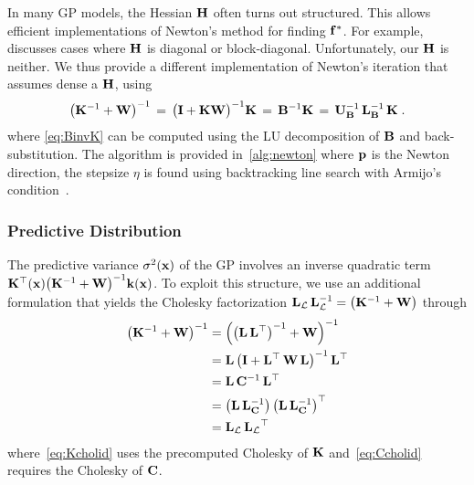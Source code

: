 In many GP models, the Hessian \(\mathbf{H}\) often turns out structured.
This allows efficient implementations of Newton's method for finding \(\mathbf{f}^*\).
For example,~\cite{rasmussen_gaussian_2006} discusses cases where \(\mathbf{H}\) is diagonal or block-diagonal.
Unfortunately, our \(\mathbf{H}\) is neither.
We thus provide a different implementation of Newton's iteration that assumes dense a \(\mathbf{H}\), using 
{\small
\begin{align}
  {\big(\mathbf{K}^{-1} + \mathbf{W}\big)}^{-1}
  \,=\, {{\big(\mathbf{I} + \mathbf{K} \mathbf{W} \big)}^{-1} \mathbf{K}} 
  \,=\, \mathbf{B}^{-1} \mathbf{K} 
  \,=\, \mathbf{U}_{\mathbf{B}}^{-1} \, \mathbf{L}_{\mathbf{B}}^{-1} \, \mathbf{K} \label{eq:BinvK}
\;.
\end{align}
}
where \cref{eq:BinvK} can be computed using the LU decomposition of \(\mathbf{B}\) and back-substitution.
The algorithm is provided in~\cref{alg:newton} where \(\mathbf{p}\) is the Newton direction, the stepsize \(\eta\) is found using backtracking line search with Armijo's condition~\cite{nocedal_numerical_2006}.

\subsubsection{Predictive Distribution}
The predictive variance \(\sigma^2(\mathbf{x})\) of the GP involves an inverse quadratic term \(\mathbf{K}^{\top}(\mathbf{x}) {\big(\mathbf{K}^{-1} + \mathbf{W}\big)}^{-1} \mathbf{k}(\mathbf{x})\).
To exploit this structure, we use an additional formulation that yields the Cholesky factorization \(\mathbf{L}_{\mathcal{L}} \, \mathbf{L}^{-1}_{\mathcal{L}}  = {\big(\mathbf{K}^{-1} + \mathbf{W}\big)}\) through 
\begin{align}
  {\big(\mathbf{K}^{-1} + \mathbf{W}\big)}^{-1}
  &= { \Big({\big(\mathbf{L}\,\mathbf{L}^{\top}\big)}^{-1} + \mathbf{W} \Big) }^{-1} \label{eq:Kcholid}  \\
  &= \mathbf{L}\,{\big(\mathbf{I} + \mathbf{L}^{\top}\,\mathbf{W}\,\mathbf{L} \big)}^{-1}\,\mathbf{L}^{\top}  \\
  &= \mathbf{L}\, \mathbf{C}^{-1} \,\mathbf{L}^{\top}  \\
  &= \big( \mathbf{L}\, \mathbf{L}_{\mathbf{C}}^{-1} \big)\, {\big( \mathbf{L}\, \mathbf{L}_{\mathbf{C}}^{-1} \big)}^{\top} \label{eq:Ccholid} \\
  &= \mathbf{L}_{\mathcal{L}} \, { \mathbf{L}_{\mathcal{L}} }^{\top}
\end{align}
where~\cref{eq:Kcholid} uses the precomputed Cholesky of \(\mathbf{K}\) and~\cref{eq:Ccholid} requires the Cholesky of \(\mathbf{C}\).

